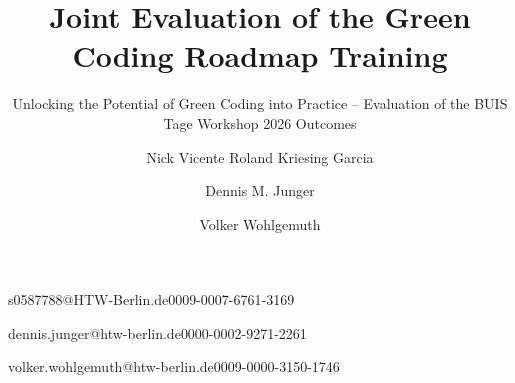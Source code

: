 \documentclass[english]{lni}
\begin{document}
\title{Joint Evaluation of the Green Coding Roadmap Training}
 \subtitle{Unlocking the Potential of Green Coding into Practice – Evaluation of the BUIS Tage Workshop 2026 Outcomes} %


\author[1]{Nick Vicente Roland Kriesing Garcia}{s0587788@HTW-Berlin.de}{0009-0007-6761-3169}
\author[1]{Dennis M. Junger}{dennis.junger@htw-berlin.de}{0000-0002-9271-2261}
\author[1]{Volker Wohlgemuth}{volker.wohlgemuth@htw-berlin.de}{0009-0000-3150-1746}
%
\maketitle
\end{document}
